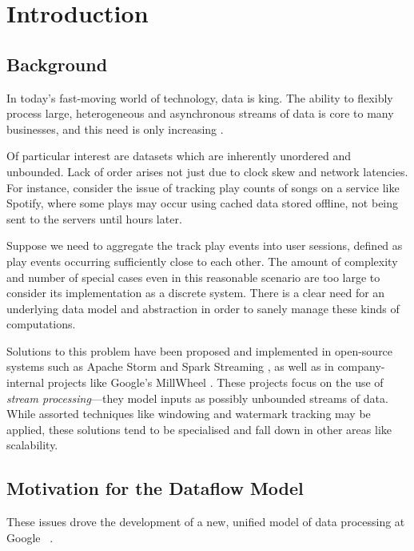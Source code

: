 \chapter{Introduction}\label{ch:intro}

\section{Background}\label{sec:intro:background}

In today's fast-moving world of technology, data is king.
The ability to flexibly process large, heterogeneous and asynchronous streams of data is core to many businesses, and this need is only increasing \cite{Yin_2015}\cite{mit_bean_variety}.

Of particular interest are datasets which are inherently unordered and unbounded.
Lack of order arises not just due to clock skew and network latencies.
For instance, consider the issue of tracking play counts of songs on a service like Spotify, where some plays may occur using cached data stored offline, not being sent to the servers until hours later.

Suppose we need to aggregate the track play events into user sessions, defined as play events occurring sufficiently close to each other.
The amount of complexity and number of special cases even in this reasonable scenario are too large to consider its implementation as a discrete system.
There is a clear need for an underlying data model and abstraction in order to sanely manage these kinds of computations.

Solutions to this problem have been proposed and implemented in open-source systems such as Apache Storm \cite{apache_storm} and Spark Streaming \cite{spark:zaharia2013discretized}, as well as in company-internal projects like Google's MillWheel \cite{akidau2013millwheel}.
These projects focus on the use of \emph{stream processing}---they model inputs as possibly unbounded streams of data.
While assorted techniques like windowing and watermark tracking may be applied, these solutions tend to be specialised and fall down in other areas like scalability.

\section{Motivation for the Dataflow Model}\label{sec:intro:motivation}

These issues drove the development of a new, unified model of data processing at Google ~\cite{Akidau:2015}.


